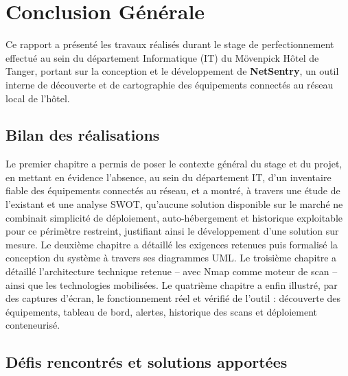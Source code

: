 \chapter*{Conclusion Générale}
\label{chapter:Conclusion}
\setcounter{section}{0}

Ce rapport a présenté les travaux réalisés durant le stage de perfectionnement effectué
au sein du département Informatique (IT) du Mövenpick Hôtel de Tanger, portant sur la
conception et le développement de \textbf{NetSentry}, un outil interne de découverte et
de cartographie des équipements connectés au réseau local de l'hôtel.

\section{Bilan des réalisations}

Le premier chapitre a permis de poser le contexte général du stage et du projet, en
mettant en évidence l'absence, au sein du département IT, d'un inventaire fiable des
équipements connectés au réseau, et a montré, à travers une étude de l'existant et une
analyse SWOT, qu'aucune solution disponible sur le marché ne combinait simplicité de
déploiement, auto-hébergement et historique exploitable pour ce périmètre restreint,
justifiant ainsi le développement d'une solution sur mesure. Le deuxième chapitre a
détaillé les exigences retenues puis formalisé la conception du système à travers ses
diagrammes UML. Le troisième chapitre a détaillé l'architecture technique retenue --
avec Nmap comme moteur de scan -- ainsi que les technologies mobilisées. Le quatrième
chapitre a enfin illustré, par des captures d'écran, le fonctionnement réel et vérifié de
l'outil : découverte des équipements, tableau de bord, alertes, historique des scans et
déploiement conteneurisé.

\section{Défis rencontrés et solutions apportées}

